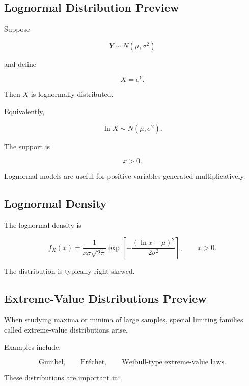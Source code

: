 \subsection{Lognormal Distribution Preview}
\label{subsec:lognormal-distribution-preview}

Suppose

\[
Y\sim N(\mu,\sigma^2)
\]

and define

\[
X=e^Y.
\]

Then \(X\) is lognormally distributed.

Equivalently,

\[
\boxed{
\ln X
\sim
N(\mu,\sigma^2).
}
\]

The support is

\[
x>0.
\]

Lognormal models are useful for positive variables generated
multiplicatively.

\subsection{Lognormal Density}
\label{subsec:lognormal-density}

The lognormal density is

\[
\boxed{
f_X(x)
=
\frac{
1
}{
x\sigma\sqrt{2\pi}
}
\exp
\left[
-
\frac{
(\ln x-\mu)^2
}{
2\sigma^2
}
\right],
\qquad
x>0.
}
\]

The distribution is typically right-skewed.

\subsection{Extreme-Value Distributions Preview}
\label{subsec:extreme-value-distributions-preview}

When studying maxima or minima of large samples, special limiting
families called extreme-value distributions arise.

Examples include:

\[
\text{Gumbel},
\qquad
\text{Fr\'echet},
\qquad
\text{Weibull-type extreme-value laws}.
\]

These distributions are important in:

